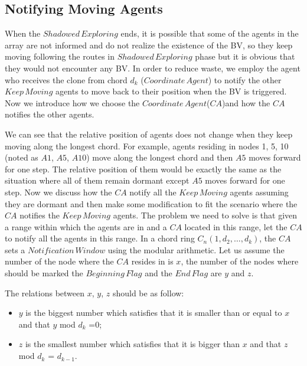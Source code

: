 \documentclass[conference]{IEEEtran}
\begin{document}
\subsection{Notifying Moving Agents}


When the $Shadowed\,Exploring$ ends, it is possible that some of the agents in the array are not informed and do not realize the existence of the BV, so they keep moving following the routes in $Shadowed\,Exploring$  phase but it is obvious that they would not encounter any BV. In order to reduce waste, we employ the agent who receives the clone from chord $d_k$ ($Coordinate\,Agent$) to notify the other $Keep\,Moving$ agents to move back to their position when the BV is triggered. Now we introduce how we choose the $Coordinate\,Agent$($CA$)and how the $CA$ notifies the other agents.\\


We can see that the relative position of agents does not change when they keep moving along the longest chord. For example, agents residing in nodes 1, 5, 10 (noted as $A1$, $A5$, $A10$) move along the longest chord and then $A5$ moves forward for one step. The relative position of them would be exactly the same as the situation where all of them remain dormant except $A5$ moves forward for one step. Now we discuss how the $CA$ notify all the $Keep\,Moving$ agents assuming they are dormant and then make some modification to fit the scenario where the $CA$ notifies the $Keep\,Moving$ agents. The problem we need to solve is that given a range within which the agents are in and a $CA$ located in this range, let the $CA$ to notify all the agents in this range. In a chord ring $C_n(1, d_2, \ldots, d_k)$, the $CA$ sets a $Notification\,Window$ using the modular arithmetic. Let us assume the number of the node where the $CA$ resides in is $x$, the number of the nodes where should be marked the $Beginning\,Flag$ and the $End\,Flag$ are $y$ and $z$. 

The relations between $x$, $y$, $z$ should be as follow: 

\begin{itemize}
\item $y$ is the biggest number which satisfies that it is smaller than or equal to $x$ and that $y$ mod $d_k$ =$0$; 
\item $z$ is the smallest number which satisfies that it is bigger than $x$ and that $z$ mod $d_k$ = $d_{k-1}$.
\end{itemize} 
\end{document}
